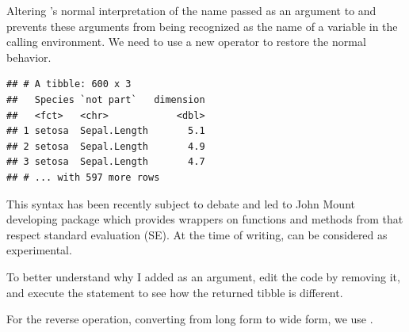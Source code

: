 \documentclass[krantz2]{krantz}\usepackage{knitr}
\begin{document}
\begin{warningbox}
Altering \Rlang's normal interpretation of the name passed as an argument to  and  prevents these arguments from being recognized as the name of a variable in the calling environment. We need to use a new operator \Roperator{!!} to restore the normal \Rlang behavior.

\begin{knitrout}\footnotesize
{}\color{fgcolor}\begin{kframe}
\begin{alltt}
 \hlkwb{<-} 
 \hlkwb{<-}   \hlstd{=} \hlopt{!!}   \hlopt{-}
\end{alltt}
\begin{verbatim}
## # A tibble: 600 x 3
##   Species `not part`   dimension
##   <fct>   <chr>            <dbl>
## 1 setosa  Sepal.Length       5.1
## 2 setosa  Sepal.Length       4.9
## 3 setosa  Sepal.Length       4.7
## # ... with 597 more rows
\end{verbatim}
\end{kframe}
\end{knitrout}

This syntax has been recently subject to debate and led to John Mount developing package  which provides wrappers on functions and methods from  that respect standard evaluation (SE). At the time of writing,  can be considered as experimental.
\end{warningbox}

\begin{playground}
To better understand why I added  as an argument, edit the code by removing it, and execute the statement to see how the returned tibble is different.
\end{playground}

For the reverse operation, converting from long form to wide form, we use .

\begin{knitrout}\footnotesize
{}\color{fgcolor}\begin{kframe}
\begin{alltt}
  \hlstd{=} \hlstd{(}\hlopt{!!}   
\end{alltt}
\end{kframe}
\end{knitrout}
\end{document}
